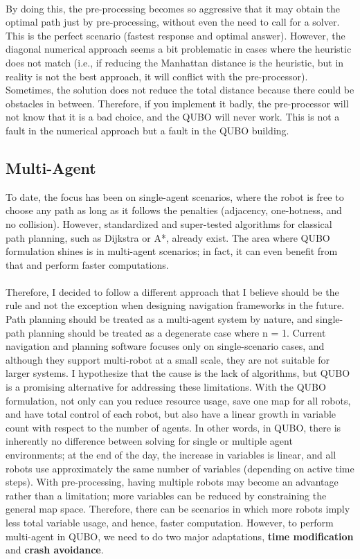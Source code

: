 \documentclass[11pt]{article}
\begin{document}
\\
By doing this, the pre-processing becomes so aggressive that it may obtain the optimal path just by pre-processing, without even the need to call for a solver. This is the perfect scenario (fastest response and optimal answer). However, the diagonal numerical approach seems a bit problematic in cases where the heuristic does not match (i.e., if reducing the Manhattan distance is the heuristic, but in reality is not the best approach, it will conflict with the pre-processor). Sometimes, the solution does not reduce the total distance because there could be obstacles in between. Therefore, if you implement it badly, the pre-processor will not know that it is a bad choice, and the QUBO will never work. This is not a fault in the numerical approach but a fault in the QUBO building.

\subsection{Multi-Agent}

To date, the focus has been on single-agent scenarios, where the robot is free to choose any path as long as it follows the penalties (adjacency, one-hotness, and no collision). However, standardized and super-tested algorithms for classical path planning, such as Dijkstra or A*, already exist. The area where QUBO formulation shines is in multi-agent scenarios; in fact, it can even benefit from that and perform faster computations. \\
\\
Therefore, I decided to follow a different approach that I believe should be the rule and not the exception when designing navigation frameworks in the future. Path planning should be treated as a multi-agent system by nature, and single-path planning should be treated as a degenerate case where n = 1. Current navigation and planning software focuses only on single-scenario cases, and although they support multi-robot at a small scale, they are not suitable for larger systems. I hypothesize that the cause is the lack of algorithms, but QUBO is a promising alternative for addressing these limitations. With the QUBO formulation, not only can you reduce resource usage, save one map for all robots, and have total control of each robot, but also have a linear growth in variable count with respect to the number of agents. In other words, in QUBO, there is inherently no difference between solving for single or multiple agent environments; at the end of the day, the increase in variables is linear, and all robots use approximately the same number of variables (depending on active time steps). With pre-processing, having multiple robots may become an advantage rather than a limitation; more variables can be reduced by constraining the general map space. Therefore, there can be scenarios in which more robots imply less total variable usage, and hence, faster computation. However, to perform multi-agent in QUBO, we need to do two major adaptations, \textbf{time modification} and \textbf{crash avoidance}.
\end{document}
